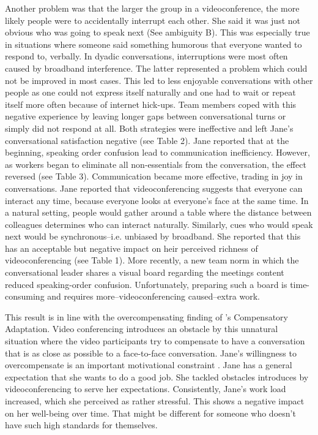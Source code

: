 \documentclass[man]{apa7}
\begin{document}
Another problem was that the larger the group in a videoconference, the more likely people were to accidentally interrupt each other. She said it was just not obvious who was going to speak next (See ambiguity B). This was especially true in situations where someone said something humorous that everyone wanted to respond to, verbally. In dyadic conversations, interruptions were most often caused by broadband interference. The latter represented a problem which could not be improved in most cases. This led to less enjoyable conversations with other people as one could not express itself naturally and one had to wait or repeat itself more often because of internet hick-ups. Team members coped with this negative experience by leaving longer gaps between conversational turns or simply did not respond at all. Both strategies were ineffective and left Jane's conversational satisfaction negative (see Table 2). Jane reported that at the beginning, speaking order confusion lead to communication inefficiency. However, as workers began to eliminate all non-essentials from the conversation, the effect reversed (see Table 3). Communication became more effective, trading in joy in conversations. Jane reported that videoconferencing suggests that everyone can interact any time, because everyone looks at everyone's face at the same time. In a natural setting, people would gather around a table where the distance between colleagues determines who can interact naturally. Similarly, cues who would speak next would be synchronous–i.e. unbiased by broadband. She reported that this has an acceptable but negative impact on heir perceived richness of videoconferencing (see Table 1). More recently, a new team norm in which the conversational leader shares a visual board regarding the meetings content reduced speaking-order confusion. Unfortunately, preparing such a board is time-consuming and requires more–videoconferencing caused–extra work.

This result is in line with the overcompensating finding of \citeauthor{Kock2005}'s Compensatory Adaptation. Video conferencing introduces an obstacle by this unnatural situation where the video participants try to compensate to have a conversation that is as close as possible to a face-to-face conversation. Jane's willingness to overcompensate is an important motivational constraint \parencite{Kock2001}. Jane has a general expectation that she wants to do a good job. She tackled obstacles introduces by videoconferencing to serve her expectations. Consistently, Jane's work load increased, which she perceived as rather stressful. This shows a negative impact on her well-being over time. That might be different for someone who doesn't have such high standards for themselves.
\end{document}
